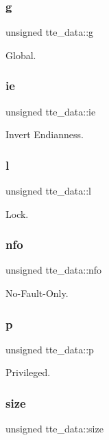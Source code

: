 \subsubsection{\texorpdfstring{g}{g}}
{\footnotesize\ttfamily unsigned tte\+\_\+data\+::g}

Global. \mbox{\label{uniontte__data_ada6abfd50fd8a677288c35f4ec52427a}} 
\subsubsection{\texorpdfstring{ie}{ie}}
{\footnotesize\ttfamily unsigned tte\+\_\+data\+::ie}

Invert Endianness. \mbox{\label{uniontte__data_a63d897b9448dee5d0d19c0a798b61d24}} 
\subsubsection{\texorpdfstring{l}{l}}
{\footnotesize\ttfamily unsigned tte\+\_\+data\+::l}

Lock. \mbox{\label{uniontte__data_a272795ac59ecdbee574dc7ae39175de9}} 
\subsubsection{\texorpdfstring{nfo}{nfo}}
{\footnotesize\ttfamily unsigned tte\+\_\+data\+::nfo}

No-\/\+Fault-\/\+Only. \mbox{\label{uniontte__data_a775130ca72c640944af03f330f3addca}} 
\subsubsection{\texorpdfstring{p}{p}}
{\footnotesize\ttfamily unsigned tte\+\_\+data\+::p}

Privileged. \mbox{\label{uniontte__data_a0ad2a8c6a1b45b62c004ebd8d4a0a230}} 
\subsubsection{\texorpdfstring{size}{size}}
{\footnotesize\ttfamily unsigned tte\+\_\+data\+::size}


